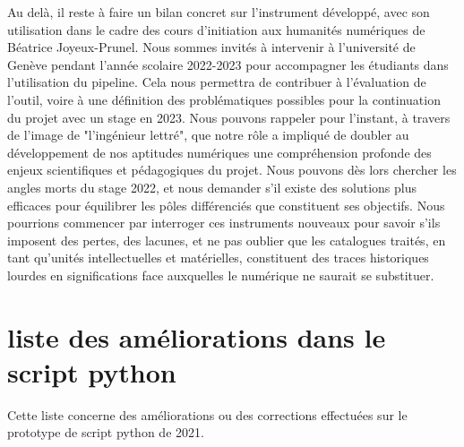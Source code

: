 \documentclass[a4paper,12pt,twoside]{book}
\begin{document}
Au delà, il reste à faire un bilan concret sur l'instrument développé, avec son utilisation dans le cadre des cours d'initiation aux humanités numériques de Béatrice Joyeux-Prunel. Nous sommes invités à intervenir à l'université de Genève pendant l'année scolaire 2022-2023 pour accompagner les étudiants dans l'utilisation du pipeline. Cela nous permettra de contribuer à l'évaluation de l'outil, voire à une définition des problématiques possibles pour la continuation du projet avec un stage en 2023. Nous pouvons rappeler pour l'instant, à travers de l'image de "l'ingénieur lettré", que notre rôle a impliqué de doubler au développement de nos aptitudes numériques une compréhension profonde des enjeux scientifiques et pédagogiques du projet. Nous pouvons dès lors chercher les angles morts du stage 2022, et nous demander s'il existe des solutions plus efficaces pour équilibrer les pôles différenciés que constituent ses objectifs. Nous pourrions commencer par interroger ces instruments nouveaux pour savoir s'ils imposent des pertes, des lacunes, et ne pas oublier que les catalogues traités, en tant qu'unités intellectuelles et matérielles, constituent des traces historiques lourdes en significations face auxquelles le numérique ne saurait se substituer. 


\appendix
\chapter{liste des améliorations dans le script python}
Cette liste concerne des améliorations ou des corrections effectuées sur le prototype de script python de 2021. 
\end{document}
